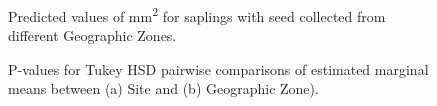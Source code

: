 \documentclass[a4paper, 11pt]{article}
\begin{document}
\begin{figure}[H]
\centering
	\caption{Predicted values of mm\textsuperscript{2} for saplings with seed collected from different Geographic Zones.}
	\label{pred_lmer}
\end{figure}

\begin{figure}[H]
\centering
	\caption{P-values for Tukey HSD pairwise comparisons of estimated marginal means between (a) Site and (b) Geographic Zone).}
	\label{lmer_margin}
\end{figure}
\end{document}
